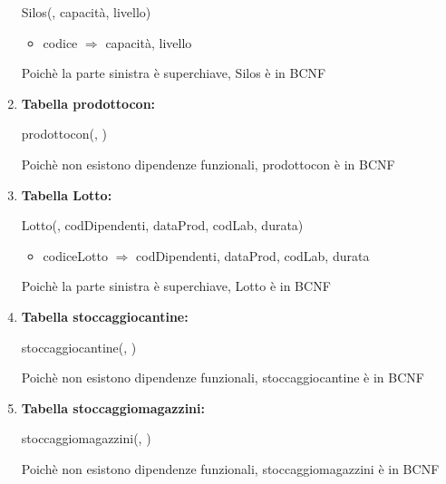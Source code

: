 \documentclass[12pt,a4paper]{article}
\begin{document}
\begin{enumerate}
Silos(\underline{}, capacità, livello)
\begin{itemize}
\vspace{-5pt}
\item codice $\Rightarrow$ capacità, livello
\vspace{-5pt}
\end{itemize}
Poichè la parte sinistra è superchiave, Silos è in BCNF
\vspace{10pt}



\item[] \textbf{Tabella prodottocon:}

prodottocon(\underline{}, \underline{})

Poichè non esistono dipendenze funzionali, prodottocon è in BCNF
\vspace{10pt}



\item[] \textbf{Tabella Lotto:}

Lotto(\underline{}, codDipendenti, dataProd, codLab, durata)
\begin{itemize}
\vspace{-5pt}
\item codiceLotto $\Rightarrow$ codDipendenti, dataProd, codLab, durata
\vspace{-5pt}
\end{itemize}
Poichè la parte sinistra è superchiave, Lotto è in BCNF
\vspace{10pt}



\item[] \textbf{Tabella stoccaggiocantine:}

stoccaggiocantine(\underline{}, \underline{})

Poichè non esistono dipendenze funzionali, stoccaggiocantine è in BCNF
\vspace{10pt}



\item[] \textbf{Tabella stoccaggiomagazzini:}

stoccaggiomagazzini(\underline{}, \underline{})

Poichè non esistono dipendenze funzionali, stoccaggiomagazzini è in BCNF
\vspace{10pt}




\end{enumerate}
\end{document}
